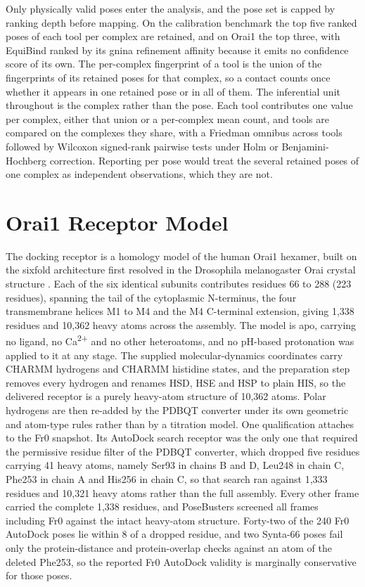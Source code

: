 Only physically valid poses enter the analysis, and the pose set is capped by ranking depth before mapping. On the calibration benchmark the top five ranked poses of each tool per complex are retained, and on Orai1 the top three, with EquiBind ranked by its gnina refinement affinity because it emits no confidence score of its own. The per-complex fingerprint of a tool is the union of the fingerprints of its retained poses for that complex, so a contact counts once whether it appears in one retained pose or in all of them. The inferential unit throughout is the complex rather than the pose. Each tool contributes one value per complex, either that union or a per-complex mean count, and tools are compared on the complexes they share, with a Friedman omnibus across tools followed by Wilcoxon signed-rank pairwise tests under Holm or Benjamini-Hochberg correction. Reporting per pose would treat the several retained poses of one complex as independent observations, which they are not.

\hypertarget{orai1-receptor-model}{%
\chapter{Orai1 Receptor Model}\label{orai1-receptor-model}}

The docking receptor is a homology model of the human Orai1 hexamer, built on the sixfold architecture first resolved in the Drosophila melanogaster Orai crystal structure \cite{ref037}. Each of the six identical subunits contributes residues 66 to 288 (223 residues), spanning the tail of the cytoplasmic N-terminus, the four transmembrane helices M1 to M4 and the M4 C-terminal extension, giving 1,338 residues and 10,362 heavy atoms across the assembly. The model is apo, carrying no ligand, no Ca\textsuperscript{2+} and no other heteroatoms, and no pH-based protonation was applied to it at any stage. The supplied molecular-dynamics coordinates carry CHARMM hydrogens and CHARMM histidine states, and the preparation step removes every hydrogen and renames HSD, HSE and HSP to plain HIS, so the delivered receptor is a purely heavy-atom structure of 10,362 atoms. Polar hydrogens are then re-added by the PDBQT converter under its own geometric and atom-type rules rather than by a titration model. One qualification attaches to the Fr0 snapshot. Its AutoDock search receptor was the only one that required the permissive residue filter of the PDBQT converter, which dropped five residues carrying 41 heavy atoms, namely Ser93 in chains B and D, Leu248 in chain C, Phe253 in chain A and His256 in chain C, so that search ran against 1,333 residues and 10,321 heavy atoms rather than the full assembly. Every other frame carried the complete 1,338 residues, and PoseBusters screened all frames including Fr0 against the intact heavy-atom structure. Forty-two of the 240 Fr0 AutoDock poses lie within 8\angstrom{} of a dropped residue, and two Synta-66 poses fail only the protein-distance and protein-overlap checks against an atom of the deleted Phe253, so the reported Fr0 AutoDock validity is marginally conservative for those poses.

